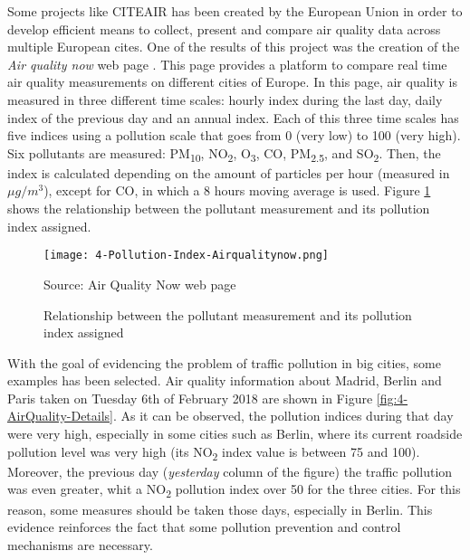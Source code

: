 Some projects like \ac{CITEAIR} has been created by the European Union \cite{citeair} in order to develop efficient means to collect, present and compare air quality data across multiple European cites. One of the results of this project was the creation of the \emph{Air quality now} web page \cite{airqualitynow}. This page provides a platform to compare real time air quality measurements on different cities of Europe. In this page, air quality is measured in three different time scales: hourly index during the last day, daily index of the previous day and an annual index. Each of this three time scales has five indices using a pollution scale that goes from 0 (very low) to 100 (very high). Six pollutants are measured: PM\textsubscript{10}, NO\textsubscript{2}, O\textsubscript{3}, CO, PM\textsubscript{2.5}, and SO\textsubscript{2}. Then, the index is calculated depending on the amount of particles per hour (measured in $\mu g/m^3$), except for CO, in which a 8 hours moving average is used. Figure \ref{fig:4-Pollution-Index-Airqualitynow} shows the relationship between the pollutant measurement and its pollution index assigned.

\begin{figure}[!h]
	\begin{center}
		\texttt{[image: 4-Pollution-Index-Airqualitynow.png]}	
		\caption{Relationship between the pollutant measurement and its pollution index assigned}{Source: Air Quality Now web page \cite{airqualitynow}}
		\label{fig:4-Pollution-Index-Airqualitynow}
	\end{center}
\end{figure}

With the goal of evidencing the problem of traffic pollution in big cities, some examples has been selected. Air quality information about Madrid, Berlin and Paris taken on Tuesday 6th of February 2018 are shown in Figure \ref{fig:4-AirQuality-Details}.
As it can be observed, the pollution indices during that day were very high, especially in some cities such as Berlin, where its current roadside pollution level was very high (its NO\textsubscript{2} index value is between 75 and 100). Moreover, the previous day (\textit{yesterday} column of the figure) the traffic pollution was even greater, whit a NO\textsubscript{2} pollution index over 50 for the three cities. For this reason, some measures should be taken those days, especially in Berlin. This evidence reinforces the fact that some pollution prevention and control mechanisms are necessary.

